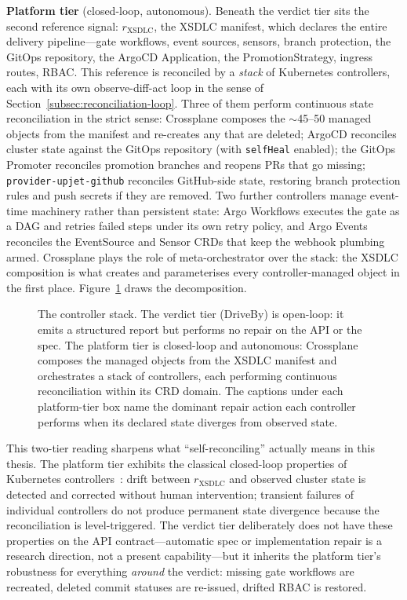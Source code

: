 \textbf{Platform tier} (closed-loop, autonomous). Beneath the verdict tier sits the second reference signal: $r_{\text{XSDLC}}$, the XSDLC manifest, which declares the entire delivery pipeline---gate workflows, event sources, sensors, branch protection, the GitOps repository, the ArgoCD Application, the PromotionStrategy, ingress routes, RBAC. This reference is reconciled by a \emph{stack} of Kubernetes controllers, each with its own observe-diff-act loop in the sense of Section~\ref{subsec:reconciliation-loop}. Three of them perform continuous state reconciliation in the strict sense: Crossplane composes the $\sim$45--50 managed objects from the manifest and re-creates any that are deleted; ArgoCD reconciles cluster state against the GitOps repository (with \texttt{selfHeal} enabled); the GitOps Promoter reconciles promotion branches and reopens PRs that go missing; \texttt{provider-upjet-github} reconciles GitHub-side state, restoring branch protection rules and push secrets if they are removed. Two further controllers manage event-time machinery rather than persistent state: Argo Workflows executes the gate as a DAG and retries failed steps under its own retry policy, and Argo Events reconciles the EventSource and Sensor CRDs that keep the webhook plumbing armed. Crossplane plays the role of meta-orchestrator over the stack: the XSDLC composition is what creates and parameterises every controller-managed object in the first place. Figure~\ref{fig:controller-stack} draws the decomposition.

\begin{figure}[htbp]
\centering
\resizebox{\textwidth}{!}{%
%
}
\caption{The controller stack. The verdict tier (DriveBy) is open-loop: it emits a structured report but performs no repair on the API or the spec. The platform tier is closed-loop and autonomous: Crossplane composes the managed objects from the XSDLC manifest and orchestrates a stack of controllers, each performing continuous reconciliation within its CRD domain. The captions under each platform-tier box name the dominant repair action each controller performs when its declared state diverges from observed state.}
\label{fig:controller-stack}
\end{figure}

This two-tier reading sharpens what ``self-reconciling'' actually means in this thesis. The platform tier exhibits the classical closed-loop properties of Kubernetes controllers~\cite{k8s-controllers}: drift between $r_{\text{XSDLC}}$ and observed cluster state is detected and corrected without human intervention; transient failures of individual controllers do not produce permanent state divergence because the reconciliation is level-triggered. The verdict tier deliberately does not have these properties on the API contract---automatic spec or implementation repair is a research direction, not a present capability---but it inherits the platform tier's robustness for everything \textit{around} the verdict: missing gate workflows are recreated, deleted commit statuses are re-issued, drifted RBAC is restored.

